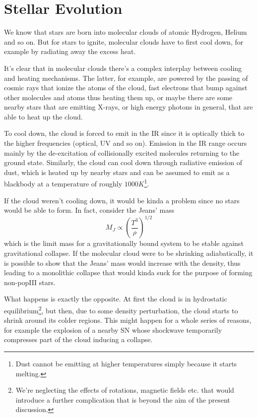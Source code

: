 \chapter{Stellar Evolution}\label{ch:v}

We know that stars are born into molecular clouds of atomic Hydrogen, Helium and so on. But for stars to ignite, molecular clouds have to first cool down, for example by radiating away the excess heat.
\par It's clear that in molecular clouds there's a complex interplay between cooling and heating mechanisms. The latter, for example, are powered by the passing of cosmic rays that ionize the atoms of the cloud, fast electrons that bump against other molecules and atoms thus heating them up, or maybe there are some nearby stars that are emitting X-rays, or high energy photons in general, that are able to heat up the cloud.
\par To cool down, the cloud is forced to emit in the IR since it is optically thick to the higher frequencies (optical, UV and so on). Emission in the IR range occurs mainly by the de-excitation of collisionally excited molecules returning to the ground state. Similarly, the cloud can cool down through radiative emission of dust, which is heated up by nearby stars and can be assumed to emit as a blackbody at a temperature of roughly $1000\unit{K}$\footnote{Dust cannot be emitting at higher temperatures simply because it starts melting.}.
\par If the cloud weren't cooling down, it would be kinda a problem since no stars would be able to form. In fact, consider the Jeans' mass 
\begin{equation*}
    M_{J} \propto \left(\frac{T^{3}}{\rho}\right)^{1/2}
\end{equation*} 
which is the limit mass for a gravitationally bound system to be stable against gravitational collapse. If the molecular cloud were to be shrinking adiabatically, it is possible to show that the Jeans' mass would increase with the density, thus leading to a monolithic collapse that would kinda suck for the purpose of forming non-popIII stars.
\par What happens is exactly the opposite. At first the cloud is in hydrostatic equilibrium\footnote{We're neglecting the effects of rotations, magnetic fields etc. that would introduce a further complication that is beyond the aim of the present discussion.}, but then, due to some density perturbation, the cloud starts to shrink around its colder regions. This might happen for a whole series of reasons, for example the explosion of a nearby SN whose shockwave temporarily compresses part of the cloud inducing a collapse.
